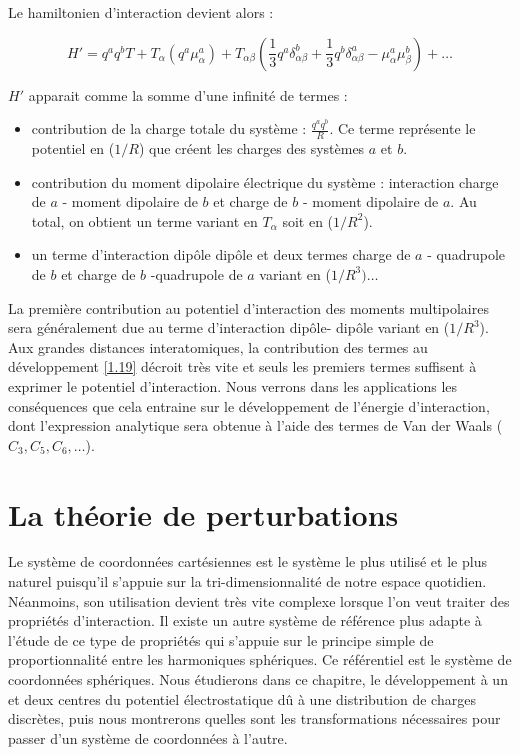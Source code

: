 	Le hamiltonien d'interaction devient alors : 
	
	\begin{equation}
	H' = q^{a} q^{b} T + T_{\alpha}(q^{a} \mu_{\alpha}^{a}) + T_{\alpha\beta} (\frac{1}{3}q^{a}\delta^{b}_{\alpha\beta}+ \frac{1}{3} q^{b}\delta^{a}_{\alpha\beta} - \mu_{\alpha}^{a}\mu_{\beta}^{b}) + \ldots  \label{1.19}
	\end{equation}
	
	$H'$ apparait comme la somme d'une infinité de termes : 
	
	\begin{itemize}
		\item contribution de la charge totale du système : $\frac{q^{a}q^{b}}{R}$. Ce terme représente le potentiel en ($1/R$) que créent les charges des systèmes $a$ et $b$.
		
		\item contribution du moment dipolaire électrique du système : interaction charge de $a$ - moment dipolaire de $b$ et charge de $b$ - moment dipolaire de $a$. Au total, on obtient un terme variant en $T_{\alpha}$ soit en ($1/R^{2}$).
		
		\item un terme d'interaction dipôle dipôle et deux termes charge de $a$ - quadrupole de $b$ et charge de $b$ -quadrupole de $a$ variant en ($1/R^{3}) \ldots$
	\end{itemize}
	
	La première contribution au potentiel d'interaction des moments multipolaires sera généralement due au terme d'interaction dipôle- dipôle variant en ($1/R^{3}$). Aux grandes distances interatomiques, la contribution des termes au développement \ref{1.19} décroit très vite et seuls les premiers termes suffisent à exprimer le potentiel d'interaction. Nous verrons dans les applications les conséquences que cela entraine sur le développement de l'énergie d'interaction, dont l'expression analytique sera obtenue à l'aide des termes de Van der Waals ($C_{3}, C_{5}, C_{6}, \ldots$).
	
	\section{La théorie de perturbations}
	
	Le système de coordonnées cartésiennes est le système le plus utilisé et le plus naturel puisqu'il s'appuie sur la tri-dimensionnalité de notre espace quotidien. Néanmoins, son utilisation devient très vite complexe lorsque l'on veut traiter des propriétés d'interaction. Il existe un autre système de référence plus adapte à l'étude de ce type de propriétés qui s'appuie sur le principe simple de proportionnalité entre les harmoniques sphériques. Ce référentiel est le système de coordonnées sphériques. Nous étudierons dans ce chapitre, le développement à un et deux centres du potentiel électrostatique dû à une distribution de charges discrètes, puis nous montrerons quelles sont les transformations nécessaires pour passer d'un système de coordonnées à l'autre. 
	
